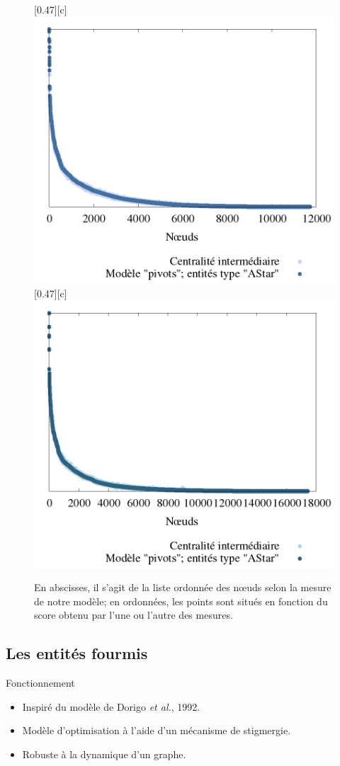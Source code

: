 \documentclass{beamer}
\begin{document}
\begin{frame}
	\begin{figure}[htbp]
		\centering
		[0.47\linewidth][c]{
			\includegraphics[width=0.47\linewidth]{./img/pivots_astar_le_havre.png}
		}
		\hfill
		[0.47\linewidth][c]{
			\includegraphics[width=0.47\linewidth]{./img/pivots_astar_rouen.png}
		}
		\caption{En abscisses, il s'agit de la liste ordonnée des n\oe uds selon la mesure de notre modèle; en ordonnées, les points sont situés en fonction du score obtenu par l'une ou l'autre des mesures.}
		\label{fig:graphiques_pivots_astar}
	\end{figure}
\end{frame}

	\subsection{Les entités fourmis}

\begin{frame}
	\begin{block}{Fonctionnement}
		\begin{itemize}
		    \item Inspiré du modèle de Dorigo \textit{et al.}, 1992. 
		    \item Modèle d'optimisation à l'aide d'un mécanisme de stigmergie.
		    \item Robuste à la dynamique d'un graphe.
		\end{itemize}
	\end{block}
\end{frame}
\end{document}
